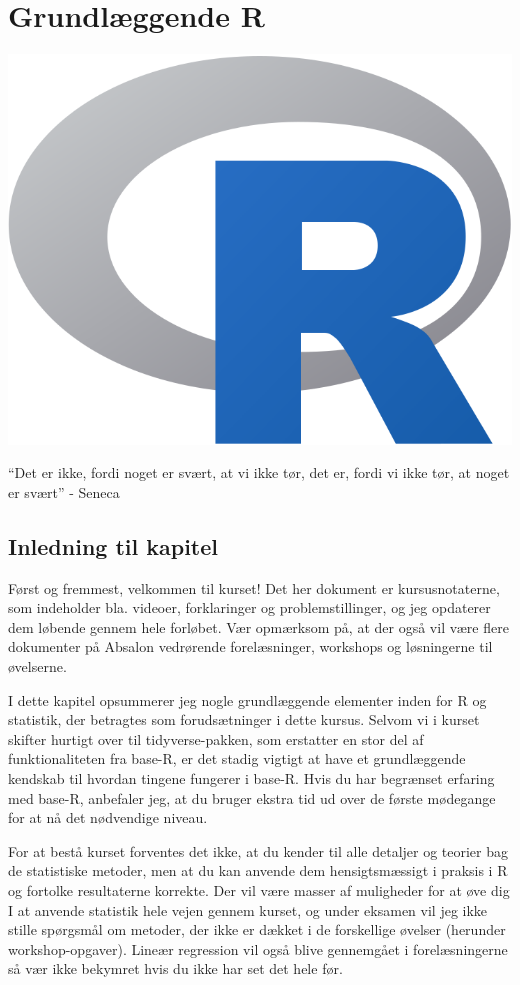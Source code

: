 \documentclass[
]{book}
\author{}
\date{\vspace{-2.5em}}
\begin{document}
{
\setcounter{tocdepth}{2}
\tableofcontents
}
\mainmatter

\chapter{Grundlæggende R}\label{baser}

\begin{center}\includegraphics[width=0.2\linewidth,height=0.2\textheight]{plots/logo_baseR} \end{center}

``Det er ikke, fordi noget er svært, at vi ikke tør, det er, fordi vi ikke tør, at noget er svært'' - Seneca

\section{Inledning til kapitel}\label{inledning-til-kapitel}

Først og fremmest, velkommen til kurset! Det her dokument er kursusnotaterne, som indeholder bla. videoer, forklaringer og problemstillinger, og jeg opdaterer dem løbende gennem hele forløbet. Vær opmærksom på, at der også vil være flere dokumenter på Absalon vedrørende forelæsninger, workshops og løsningerne til øvelserne.

I dette kapitel opsummerer jeg nogle grundlæggende elementer inden for R og statistik, der betragtes som forudsætninger i dette kursus. Selvom vi i kurset skifter hurtigt over til tidyverse-pakken, som erstatter en stor del af funktionaliteten fra base-R, er det stadig vigtigt at have et grundlæggende kendskab til hvordan tingene fungerer i base-R. Hvis du har begrænset erfaring med base-R, anbefaler jeg, at du bruger ekstra tid ud over de første mødegange for at nå det nødvendige niveau.

For at bestå kurset forventes det ikke, at du kender til alle detaljer og teorier bag de statistiske metoder, men at du kan anvende dem hensigtsmæssigt i praksis i R og fortolke resultaterne korrekte. Der vil være masser af muligheder for at øve dig I at anvende statistik hele vejen gennem kurset, og under eksamen vil jeg ikke stille spørgsmål om metoder, der ikke er dækket i de forskellige øvelser (herunder workshop-opgaver). Lineær regression vil også blive gennemgået i forelæsningerne så vær ikke bekymret hvis du ikke har set det hele før.
\end{document}
